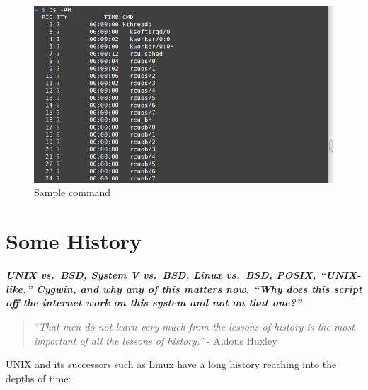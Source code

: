 \documentclass[10pt,]{book}
\numberwithin{figure}{chapter}
\begin{document}
\else

\begin{figure}[htbp]
\centering
\includegraphics{./images/ps-AH.png}
\caption{Sample command}
\end{figure}

\fi

\chapter{Some History}\label{some-history}

\textbf{\emph{UNIX vs.~BSD, System V vs.~BSD, Linux vs.~BSD, POSIX,
``UNIX-like,'' Cygwin, and why any of this matters now. ``Why does this
script off the internet work on this system and not on that one?''}}

\begin{quote}
\emph{``That men do not learn very much from the lessons of history is
the most important of all the lessons of history.''} - Aldous Huxley
\end{quote}

UNIX and its successors such as Linux have a long history reaching into
the depths of time:
\end{document}
